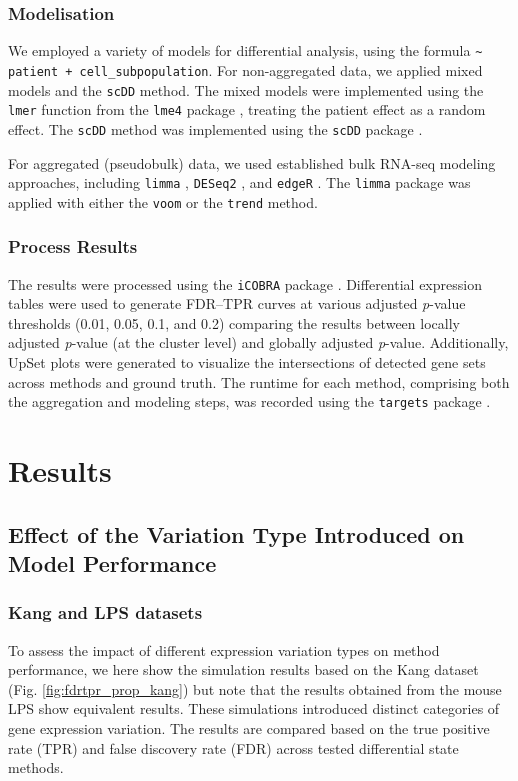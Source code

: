 \documentclass[a4paper, 11pt, twocolumn]{article}
\begin{document}
\begin{multicols}{2}
\subsubsection{Modelisation}

We employed a variety of models for differential analysis, using the formula \texttt{\textasciitilde{} patient + cell\_subpopulation}. For non-aggregated data, we applied mixed models and the \texttt{scDD} method. The mixed models were implemented using the \texttt{lmer} function from the \texttt{lme4} package \citep{lme4}, treating the patient effect as a random effect. The \texttt{scDD} method was implemented using the \texttt{scDD} package \citep{scdd}.

For aggregated (pseudobulk) data, we used established bulk RNA-seq modeling approaches, including \texttt{limma} \citep{limma}, \texttt{DESeq2} \citep{deseq2}, and \texttt{edgeR} \citep{edger}. The \texttt{limma} package was applied with either the \texttt{voom} or the \texttt{trend} method.

\subsubsection{Process Results}

The results were processed using the \texttt{iCOBRA} package \citep{icobra}. Differential expression tables were used to generate FDR–TPR curves at various adjusted \textit{p}-value thresholds (0.01, 0.05, 0.1, and 0.2) comparing the results between locally adjusted \textit{p}-value (at the cluster level) and globally adjusted \textit{p}-value. Additionally, UpSet plots were generated to visualize the intersections of detected gene sets across methods and ground truth. The runtime for each method, comprising both the aggregation and modeling steps, was recorded using the \texttt{targets} package \citep{targets}.
	
\section{Results}

\subsection{Effect of the Variation Type Introduced on Model Performance}

\subsubsection{Kang and LPS datasets}
To assess the impact of different expression variation types on method performance, we here show the simulation results based on the Kang dataset (Fig. \ref{fig:fdrtpr_prop_kang}) but note that the results obtained from the mouse LPS show equivalent results. These simulations introduced distinct categories of gene expression variation. The results are compared based on the true positive rate (TPR) and false discovery rate (FDR) across tested differential state methods.


\end{multicols}
\end{document}
